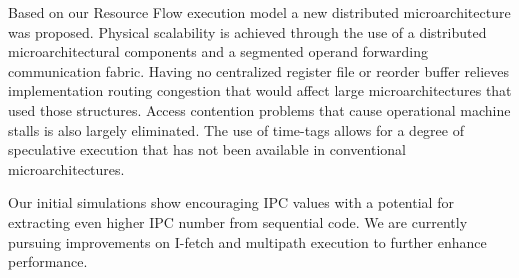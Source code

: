 \documentclass[10pt,twocolumn]{IEEEtran}
\begin{document}
Based on our Resource Flow execution model a new distributed
microarchitecture was proposed.  Physical scalability is achieved
through the use of a distributed microarchitectural components and a
segmented operand forwarding communication fabric.  Having no
centralized register file or reorder buffer relieves implementation
routing congestion that would affect large microarchitectures that
used those structures.
Access contention problems that cause operational
machine stalls is also largely eliminated.
The use of
time-tags allows for a degree of speculative execution that has not
been available in conventional microarchitectures.

Our initial simulations show encouraging IPC values with a potential
for extracting even higher IPC number from sequential code.  We are
currently pursuing improvements on I-fetch and multipath execution to
further enhance performance.

%


%
\end{document}
